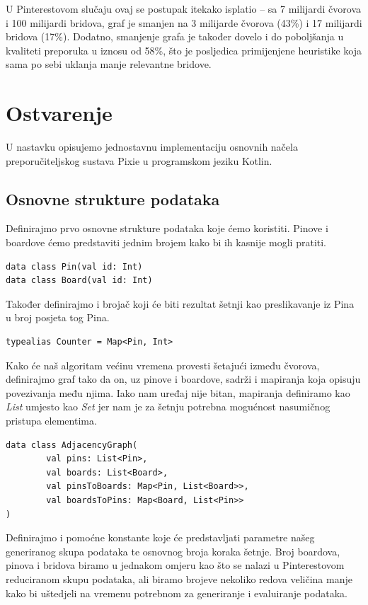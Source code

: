 \documentclass[times, utf8, seminar]{fer}
\begin{document}
U Pinterestovom slučaju ovaj se postupak itekako isplatio -- sa 7 milijardi čvorova i 100 milijardi bridova, graf je smanjen na 3 milijarde čvorova (43\%) i 17 milijardi bridova (17\%). Dodatno, smanjenje grafa je također dovelo i do poboljšanja u kvaliteti preporuka u iznosu od 58\%, što je posljedica primijenjene heuristike koja sama po sebi uklanja manje relevantne bridove.

\chapter{Ostvarenje}

U nastavku opisujemo jednostavnu implementaciju osnovnih načela preporučiteljskog sustava Pixie u programskom jeziku Kotlin.

\section{Osnovne strukture podataka}

Definirajmo prvo osnovne strukture podataka koje ćemo koristiti. Pinove i boardove ćemo predstaviti jednim brojem kako bi ih kasnije mogli pratiti.

\begin{lstlisting}
data class Pin(val id: Int)
data class Board(val id: Int)
\end{lstlisting}

Također definirajmo i brojač koji će biti rezultat šetnji kao preslikavanje iz Pina u broj posjeta tog Pina.

\begin{lstlisting}
typealias Counter = Map<Pin, Int>
\end{lstlisting}

Kako će naš algoritam većinu vremena provesti šetajući između čvorova, definirajmo graf tako da on, uz pinove i boardove, sadrži i mapiranja koja opisuju povezivanja među njima. Iako nam uređaj nije bitan, mapiranja definiramo kao \textit{List} umjesto kao \textit{Set} jer nam je za šetnju potrebna mogućnost nasumičnog pristupa elementima.

\begin{lstlisting}
data class AdjacencyGraph(
        val pins: List<Pin>,
        val boards: List<Board>,
        val pinsToBoards: Map<Pin, List<Board>>,
        val boardsToPins: Map<Board, List<Pin>>
)
\end{lstlisting}

Definirajmo i pomoćne konstante koje će predstavljati parametre našeg generiranog skupa podataka te osnovnog broja koraka šetnje. Broj boardova, pinova i bridova biramo u jednakom omjeru kao što se nalazi u Pinterestovom reduciranom skupu podataka, ali biramo brojeve nekoliko redova veličina manje kako bi uštedjeli na vremenu potrebnom za generiranje i evaluiranje podataka.
\end{document}
